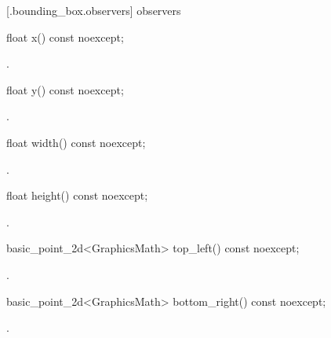  [\iotwod.bounding_box.observers]{ observers}

%
\begin{itemdecl}
float x() const noexcept;
\end{itemdecl}
\begin{itemdescr}
\pnum
\returns
{}.
\end{itemdescr}

%
\begin{itemdecl}
float y() const noexcept;
\end{itemdecl}
\begin{itemdescr}
\pnum
\returns
{}.
\end{itemdescr}

%
\begin{itemdecl}
float width() const noexcept;
\end{itemdecl}
\begin{itemdescr}
\pnum
\returns
{}.
\end{itemdescr}

%
\begin{itemdecl}
float height() const noexcept;
\end{itemdecl}
\begin{itemdescr}
\pnum
\returns
{}.
\end{itemdescr}

%
\begin{itemdecl}
basic_point_2d<GraphicsMath> top_left() const noexcept;
\end{itemdecl}
\begin{itemdescr}
\pnum
\returns
{}.
\end{itemdescr}

%
\begin{itemdecl}
basic_point_2d<GraphicsMath> bottom_right() const noexcept;
\end{itemdecl}
\begin{itemdescr}
\pnum
\returns
{}.
\end{itemdescr}

